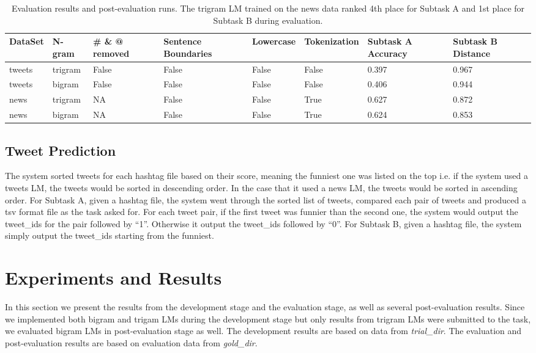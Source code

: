 \documentclass[11pt,a4paper]{article}
\begin{document}
\begin{table*}[h!]
\centering
\begin{tabular}{ |p{1.2cm}|p{1.2cm}|p{1.2cm}|p{1.7cm}|p{1.5cm}|p{1.9cm}|p{1.7cm}|p{1.7cm}|}
\hline
DataSet & N-gram & \# \& @ removed  & Sentence Boundaries & Lowercase & Tokenization & Subtask A Accuracy & Subtask B Distance \\
\hline
tweets & trigram & False & False & False & False & 0.397 & 0.967 \\
\hline
tweets & bigram & False & False & False & False & 0.406 & 0.944 \\
\hline
news & trigram & NA & False & False & True & 0.627 & 0.872 \\
\hline
news & bigram & NA & False & False & True & 0.624 & 0.853 \\
\hline
\end{tabular}
\caption{Evaluation results and post-evaluation runs. The trigram LM trained on the news data ranked 4th place for Subtask A and 1st place for Subtask B during evaluation.}
\label{table:4}
\end{table*}



\subsection{Tweet Prediction}
The system sorted tweets for each hashtag file based on their score, meaning the funniest one was listed on the top i.e. if the system used a tweets LM, the tweets would be sorted in descending order. In the case that it used a news LM, the tweets would be sorted in ascending order. For Subtask A, given a hashtag file, the system went through the sorted list of tweets, compared each pair of tweets and produced a tsv format file as the task asked for. For each tweet pair, if the first tweet was funnier than the second one, the system would output the tweet\_ids for the pair followed by ``1''. Otherwise it output the tweet\_ids followed by ``0''. For Subtask B, given a hashtag file, the system simply output the tweet\_ids starting from the funniest.


\section{Experiments and Results}
In this section we present the results from the development stage and the evaluation stage, as well as several post-evaluation results. Since we implemented both bigram and trigam LMs during the development stage but only results from trigram LMs were submitted to the task, we evaluated bigram LMs in post-evaluation stage as well. The development results are based on data from \textit{trial\_dir}. The evaluation and post-evaluation results are based on evaluation data from \textit{gold\_dir}.
\end{document}
